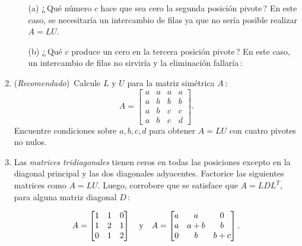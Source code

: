 \begin{enumerate}
\begin{itemize}
\item[(a)]¿\,Qué número $c$ hace que sea cero la segunda posición pivote\,?
  En este caso, se necesitaría un intercambio de filas ya que no sería posible realizar $A=LU$.
  
\item[(b)]¿\,Qué $c$ produce un cero en la tercera posición pivote\,?
  En este caso, un intercambio de filas no sirviría y la eliminación fallaría\,:
\end{itemize}
%
%

\item (\emph{Recomendado})\, Calcule $L$ y $U$ para la matriz sim\'etrica $A$\,:
\begin{displaymath}
  A=\begin{bmatrix} a & a & a & a\\ a & b & b & b\\
    a & b & c & c\\ a & b & c & d\end{bmatrix}.
\end{displaymath}
%
Encuentre condiciones sobre $a,b,c,d$ para obtener $A=LU$ con cuatro pivotes no nulos.\linebreak\vspace{-11pt}

\item Las \emph{matrices tridiagonales} tienen ceros en todas las posiciones excepto en la diagonal principal y las dos diagonales adyacentes. Factorice las siguientes matrices como $A=LU$.
Luego, corrobore que se satisface que $A=LDL^T$, para alguna matriz diagonal $D$\,:

\vspace{-11pt}
\begin{displaymath}
  A=\begin{bmatrix}
    1 & 1 & 0\\ 1 & 2 & 1\\ 0 & 1 & 2\end{bmatrix}
  \quad\hbox{y}\quad A=
  \begin{bmatrix} a & a & 0\\ a & a+b & b\\
    0 & b & b+c\end{bmatrix}.
\end{displaymath}



\end{enumerate}
